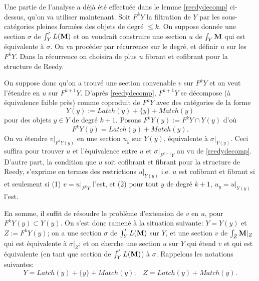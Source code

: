 \documentclass[12pt]{article}
\newcommand{\mm}{{\bf M}}
\begin{document}
Une partie de l'analyse a d\'ej\`a \'et\'e effectu\'ee dans le lemme
\ref{reedydecomp} ci-dessus, qu'on va utiliser maintenant. Soit $F^kY$ la
filtration de $Y$ par
les sous-cat\'egories pleines form\'ees des objets de degr\'e $\leq k$. On
suppose donn\'ee une section $\sigma$ de $\int '_YL(\mm )$ et on voudrait
construire une section $u$ de $\int _Y\mm$ qui est \'equivalente \`a $\sigma$.
On va proc\'eder par r\'ecurrence sur le degr\'e,
et d\'efinir $u$ sur les
$F^kY$.
Dans la r\'ecurrence on choisira de plus $u$ fibrant et cofibrant pour la
structure de Reedy.

On suppose
donc qu'on a trouv\'e une section convenable $v$ sur $F^kY$ et on veut
l'\'etendre en $u$ sur $F^{k+1}Y$.
D'apr\`es \ref{reedydecomp}, $F^{k+1}Y$ se d\'ecompose (\`a \'equivalence faible
pr\`es) comme coproduit de $F^kY$
avec des cat\'egories de la forme
$$
Y(y):= Latch (y) + \{ y\} + Match (y)
$$
pour des objets $y\in Y$ de degr\'e $k+1$.
Posons  $F^kY(y):= F^kY\cap Y(y)$ d'o\`u
$$
F^kY(y)= Latch (y)  + Match (y).
$$
On va \'etendre $v|_{F^kY(y)}$ en une section $u_y$ sur $Y(y)$,
\'equivalente \`a $\sigma |_{Y(y)}$. Ceci suffira pour trouver $u$ et
l'\'equivalence entre $u$ et $\sigma |_{F^{k+1}Y}$ au vu de \ref{reedydecomp}.
D'autre part, la condition que $u$ soit cofibrant et fibrant pour la structure
de Reedy, s'exprime en termes des restrictions $u|_{Y(y)}$ i.e. $u$ est
cofibrant et fibrant si et seulement si (1) $v= u|_{F^kY}$ l'est, et
(2) pour tout $y$ de degr\'e  $k+1$, $u_y= u|_{Y(y)}$ l'est.

En somme, il suffit
de r\'esoudre le probl\`eme d'extension de $v$ en $u$, pour $F^kY(y) \subset
Y(y)$.
On s'est donc ramen\'e \`a la situation suivante: $Y=Y(y)$ et $Z:= F^kY(y)$;
on  a une section $\sigma$ de $\int '_YL(\mm )$ sur $Y$, et une section
$v$ de $\int _Z\mm |_Z$ qui est \'equivalente \`a $\sigma |_Z$; et on
cherche une section $u$ sur $Y$ qui \'etend $v$ et qui est \'equivalente
(en tant que section de $\int '_YL(\mm )$) \`a $\sigma$.
Rappelons les notations suivantes:
$$
Y= Latch (y) + \{ y\} + Match (y);\;\;\;
Z= Latch (y) + Match (y).
$$
\end{document}
